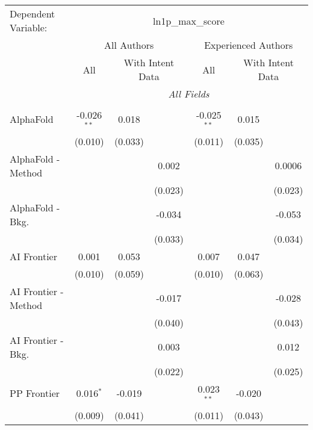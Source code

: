 \begingroup
\centering
\begin{tabular}{lcccccc}
   \tabularnewline \midrule \midrule
   Dependent Variable: & \multicolumn{6}{c}{ln1p\_max\_score}\\
 & \multicolumn{3}{c}{All Authors} & \multicolumn{3}{c}{Experienced Authors} \\
\cmidrule(lr){2-4} \cmidrule(lr){5-7}
 & \multicolumn{1}{c}{All} & \multicolumn{2}{c}{With Intent Data} & \multicolumn{1}{c}{All} & \multicolumn{2}{c}{With Intent Data} \\
\cmidrule(lr){2-2} \cmidrule(lr){3-4} \cmidrule(lr){5-5} \cmidrule(lr){6-7}
 & \multicolumn{6}{c}{\textit{All Fields}} \\ \\
   AlphaFold            & -0.026$^{**}$ & 0.018   &         & -0.025$^{**}$ & 0.015   &   \\   
                        & (0.010)       & (0.033) &         & (0.011)       & (0.035) &   \\   
   AlphaFold - Method   &               &         & 0.002   &               &         & 0.0006\\   
                        &               &         & (0.023) &               &         & (0.023)\\   
   AlphaFold - Bkg.     &               &         & -0.034  &               &         & -0.053\\   
                        &               &         & (0.033) &               &         & (0.034)\\   
   AI Frontier          & 0.001         & 0.053   &         & 0.007         & 0.047   &   \\   
                        & (0.010)       & (0.059) &         & (0.010)       & (0.063) &   \\   
   AI Frontier - Method &               &         & -0.017  &               &         & -0.028\\   
                        &               &         & (0.040) &               &         & (0.043)\\   
   AI Frontier - Bkg.   &               &         & 0.003   &               &         & 0.012\\   
                        &               &         & (0.022) &               &         & (0.025)\\   
   PP Frontier          & 0.016$^{*}$   & -0.019  &         & 0.023$^{**}$  & -0.020  &   \\   
                        & (0.009)       & (0.041) &         & (0.011)       & (0.043) &   \\   

\end{tabular}
